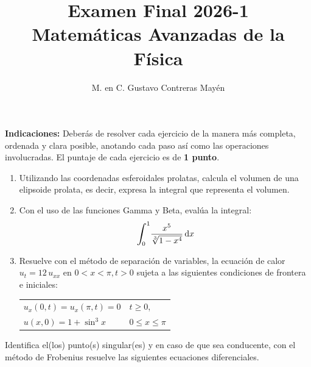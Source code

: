 \documentclass[hidelinks,12pt]{article}
\title{Examen Final 2026-1 \\[0.3em]  \large{Matemáticas Avanzadas de la Física}\vspace{-3ex}}
\author{M. en C. Gustavo Contreras Mayén}
\date{ }
\def\scaleint#1{\vcenter{\hbox{\scaleto[3ex]{\displaystyle\int}{#1}}}}
\def\bs{\mkern-12mu}
\begin{document}
\vspace{-4cm}
\maketitle
\fontsize{14}{14}\selectfont

\textbf{Indicaciones: } Deberás de resolver cada ejercicio de la manera más completa, ordenada y clara posible, anotando cada paso así como las operaciones involucradas. El puntaje de cada ejercicio es de \textbf{1 punto}.

\begin{enumerate}
\item Utilizando las coordenadas esferoidales prolatas, calcula el volumen de una elipsoide prolata, es decir, expresa la integral que representa el volumen.
\item \label{ejercicio_09} Con el uso de las funciones Gamma y Beta, evalúa la integral:
\begin{align*}
\scaleint{6ex}_{\bs 0}^{1} \dfrac{x^{5}}{\sqrt[3]{1 - x^{4}}} \dd{x}
\end{align*}
\item Resuelve con el método de separación de variables, la ecuación de calor $u_{t} = 12 \, u_{xx}$ en $0 < x < \pi, t > 0$ sujeta a las siguientes condiciones de frontera e iniciales:
\begin{table}[H]
\centering
\begin{tabular}{l l}
$u_{x} (0, t) = u_{x} (\pi, t) = 0$ & $t \geq 0$, \\
$u(x, 0) = 1 + \sin^{3} x$ & $0 \leq x \leq \pi$
\end{tabular}
\end{table}
\end{enumerate}
Identifica el(los) punto(s) singular(es) y en caso de que sea conducente, con el método de Frobenius resuelve las siguientes ecuaciones diferenciales.
\end{document}
